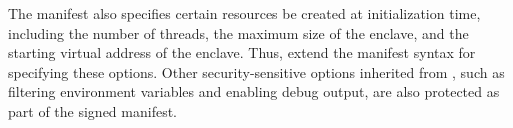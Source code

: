 The manifest also specifies certain resources be created at initialization time,
including the number of threads,
the maximum size of the enclave, and the starting virtual address of the enclave.
Thus, \graphenesgx{} extend the \graphene{} manifest syntax for  specifying these options.
Other security-sensitive options inherited from \graphene{}, such as filtering environment variables
and enabling debug output, are also protected as part of the signed manifest.




